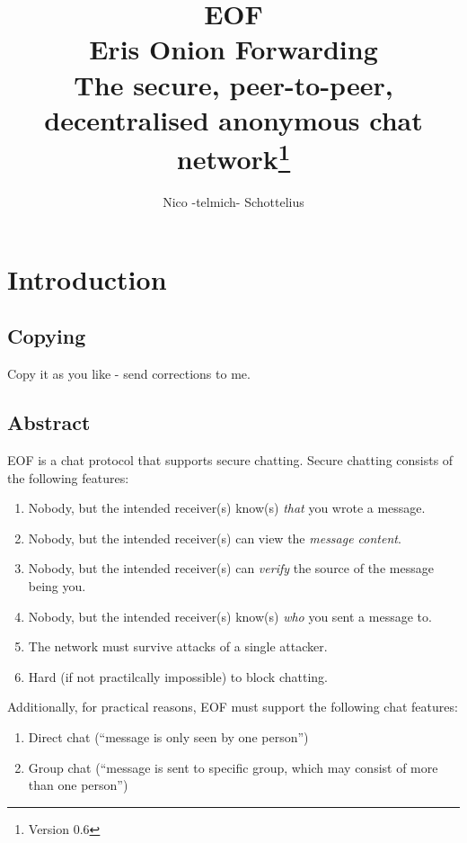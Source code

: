 \documentclass[12pt,a4paper]{book}
\begin{document}
\title{EOF\\Eris Onion Forwarding\\
The secure, peer-to-peer, decentralised
anonymous chat network\thanks{Version 0.6}}
\author{Nico -telmich- Schottelius}

\maketitle
\tableofcontents

\chapter{Introduction}
\section{Copying}
Copy it as you like - send corrections to me.
\section{Abstract}
EOF is a chat protocol that supports secure chatting.
Secure chatting consists of the following features:
\begin{enumerate}
\item Nobody, but the intended receiver(s) know(s) \emph{that} you wrote a message.
\item Nobody, but the intended receiver(s) can view the \emph{message content}.
\item Nobody, but the intended receiver(s) can \emph{verify} the source of the message being you.
\item Nobody, but the intended receiver(s) know(s) \emph{who} you sent a message to.
\item The network must survive attacks of a single attacker.
\item Hard (if not practilcally impossible) to block chatting.
\end{enumerate}
Additionally, for practical reasons, EOF must support the following
chat features:
\begin{enumerate}
\item Direct chat ("`message is only seen by one person"')
\item Group chat ("`message is sent to specific group, which may consist of
more than one person"')
\end{enumerate}
\end{document}
